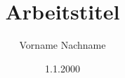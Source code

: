 \makeatletter
\def\thickhrulefill{\leavevmode \leaders \hrule height 2pt\hfill \kern \z@}
\renewcommand{\maketitle}{\begin{titlepage}%
    \let\footnotesize\small
    \let\footnoterule\relax
    \parindent \z@
    \reset@font
    \null
    \vskip 5\p@
    \hskip 55
    \hbox{\mbox{%
        \hspace{4pt}%
        \fbox{\texttt{[image: bilder/hplogo.jpg]}}%
        \hspace{4pt}
        }%
      \vrule width 3 depth 0.90\textheight
      \mbox{\hspace{2pt}}
      \vtop{%
        \vskip 80\p@
        \begin{flushleft}
          \Large \sffamily \@author \par
          \Large \sffamily Matrikelnummer: 20007 \par
        \end{flushleft}
        \vskip 60\p@
        \begin{flushleft}
          \huge \sffamily \@title \par
        \end{flushleft}
        \vskip 1\p@
        \begin{flushleft}
          \huge \sffamily <FIRMENNAME-HIER> \par
        \end{flushleft}
        \vfil
        }}
    \null
  \end{titlepage}%
  \setcounter{footnote}{0}%
}

\makeatother
\author{Vorname Nachname}
\title{Arbeitstitel}
\date{1.1.2000}